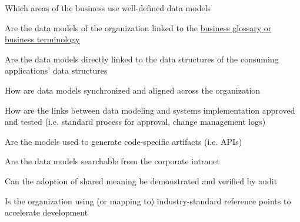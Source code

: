 \begin{core-questions}

  \item [\thesection.1] Which areas of the business use well-defined data models
  \item [\thesection.2] Are the data models of the organization linked to the
                        \hyperref[sec:ekg-mm-business-terminology]{business glossary or business terminology}
  \item [\thesection.3] Are the data models directly linked to the data structures of the consuming applications'
                        data structures
  \item [\thesection.4] How are data models synchronized and aligned across the organization
  \item [\thesection.5] How are the links between data modeling and systems implementation approved and tested
                        (i.e. standard process for approval, change management logs)
  \item [\thesection.6] Are the models used to generate code-specific artifacts (i.e. APIs)
  \item [\thesection.7] Are the data models searchable from the corporate intranet
  \item [\thesection.8] Can the adoption of shared meaning be demonstrated and verified by audit
  \item [\thesection.9] Is the organization using (or mapping to) industry-standard reference points to
                        accelerate development

\end{core-questions}

\ekgmmCapabilitySectionLevelsOneFive

\ekgmmscoringlevelOne

